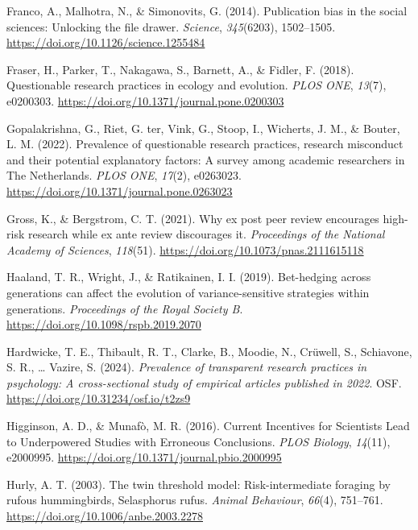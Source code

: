 \documentclass[
  british,
  a4paper,
  ,man,floatsintext]{apa6}
\newlength{\cslhangindent}
\newenvironment{CSLReferences}[2] %
 {\begin{list}{}{%
  \setlength{\itemindent}{0pt}
  \setlength{\leftmargin}{0pt}
  \setlength{\parsep}{0pt}
  \ifodd #1
   \setlength{\leftmargin}{\cslhangindent}
   \setlength{\itemindent}{-1\cslhangindent}
  \fi
  \setlength{\itemsep}{#2\baselineskip}}}
 {\end{list}}
\begin{document}
\begin{CSLReferences}{1}{0}
Franco, A., Malhotra, N., \& Simonovits, G. (2014). Publication bias in the social sciences: {Unlocking} the file drawer. \emph{Science}, \emph{345}(6203), 1502--1505. \url{https://doi.org/10.1126/science.1255484}

Fraser, H., Parker, T., Nakagawa, S., Barnett, A., \& Fidler, F. (2018). Questionable research practices in ecology and evolution. \emph{PLOS ONE}, \emph{13}(7), e0200303. \url{https://doi.org/10.1371/journal.pone.0200303}

Gopalakrishna, G., Riet, G. ter, Vink, G., Stoop, I., Wicherts, J. M., \& Bouter, L. M. (2022). Prevalence of questionable research practices, research misconduct and their potential explanatory factors: {A} survey among academic researchers in {The Netherlands}. \emph{PLOS ONE}, \emph{17}(2), e0263023. \url{https://doi.org/10.1371/journal.pone.0263023}

Gross, K., \& Bergstrom, C. T. (2021). Why ex post peer review encourages high-risk research while ex ante review discourages it. \emph{Proceedings of the National Academy of Sciences}, \emph{118}(51). \url{https://doi.org/10.1073/pnas.2111615118}

Haaland, T. R., Wright, J., \& Ratikainen, I. I. (2019). Bet-hedging across generations can affect the evolution of variance-sensitive strategies within generations. \emph{Proceedings of the Royal Society B}. \url{https://doi.org/10.1098/rspb.2019.2070}

Hardwicke, T. E., Thibault, R. T., Clarke, B., Moodie, N., Crüwell, S., Schiavone, S. R., \ldots{} Vazire, S. (2024). \emph{Prevalence of transparent research practices in psychology: {A} cross-sectional study of empirical articles published in 2022}. OSF. \url{https://doi.org/10.31234/osf.io/t2zs9}

Higginson, A. D., \& Munafò, M. R. (2016). Current {Incentives} for {Scientists Lead} to {Underpowered Studies} with {Erroneous Conclusions}. \emph{PLOS Biology}, \emph{14}(11), e2000995. \url{https://doi.org/10.1371/journal.pbio.2000995}

Hurly, A. T. (2003). The twin threshold model: Risk-intermediate foraging by rufous hummingbirds, {Selasphorus} rufus. \emph{Animal Behaviour}, \emph{66}(4), 751--761. \url{https://doi.org/10.1006/anbe.2003.2278}


\end{CSLReferences}
\end{document}
